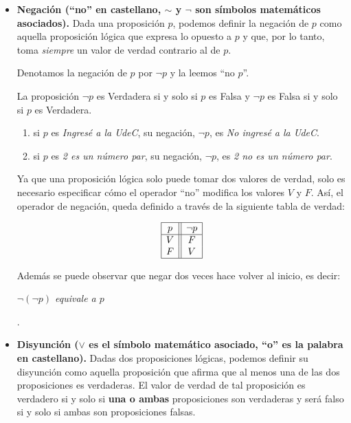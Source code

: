 \begin{itemize}
\item \textbf{Negaci\'on (``no'' en castellano,
	$\sim$ y $\neg$ son s\'imbolos matem\'aticos asociados).}
Dada una proposici\'on $p$, podemos definir 
la negación de $p$ 
como aquella proposición lógica que 
expresa lo opuesto a $p$ 
y que, por lo tanto, toma {\em siempre} 
un valor de verdad contrario al de $p$.

Denotamos la negación de $p$ por $
\neg p$ y la leemos 
``no $p$''. 

La proposici\'on $
\neg p$
es Verdadera si y solo si $p$ es Falsa y $
\neg p$ es Falsa
si y solo si $p$ es Verdadera.

\medskip


\begin{ejemplo}\leavevmode
\begin{enumerate}
\item si $p$ es {\em Ingres\'e a la UdeC},
su negaci\'on, $
\neg p$, es {\em No ingres\'e a la UdeC}.

\item si $p$ es {\em 2 es un n\'umero par}, 
su negaci\'on, $
\neg p$, es  {\em 2 no es un n\'umero par}.
\end{enumerate}
\end{ejemplo}

Ya que una proposición lógica solo puede 
tomar dos valores de verdad, 
solo es necesario especificar 
c\'omo el operador ``no'' modifica los valores $V$ y $F$.
Así, el operador de negación, queda definido a trav\'es de la 
siguiente tabla de verdad:

$$\begin{array}{|c||c|}
\hline
 p& 
\neg p \cr
\hline
V&F\cr
F&V\cr
\hline
\end{array}$$


Además se puede observar que negar dos veces hace volver al inicio, es decir:\\
\centerline{\em $
\neg(
\neg p)$ equivale a $p$}.

\medskip 

\item \textbf{Disyunci\'on  ($\vee$ es el
	s\'imbolo matem\'atico asociado, ``o''
	es la palabra en castellano).} 
	Dadas dos proposiciones lógicas, 
	podemos definir su disyunción como aquella proposición 
	que afirma que al menos una de las dos proposiciones es verdaderas.
	El valor de verdad de tal proposición es verdadero si y solo si 
	\textbf{una o ambas} proposiciones son verdaderas 
	y será falso si y solo si ambas son proposiciones falsas.


\end{itemize}
